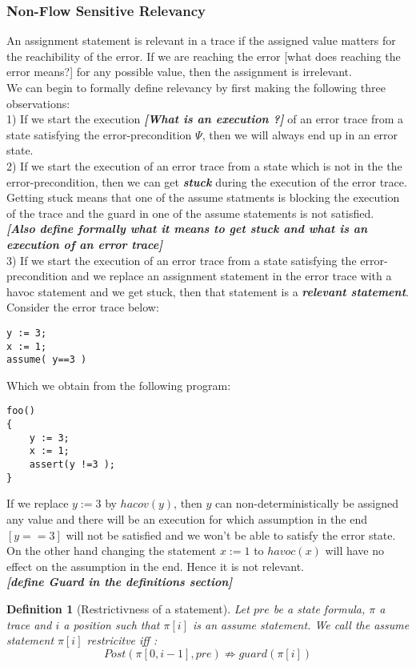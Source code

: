 \documentclass{article}
\newcommand{\limp}{\Rightarrow}
\newtheorem{mydef}{Definition}
\begin{document}
\subsubsection{Non-Flow Sensitive Relevancy}
An assignment statement is relevant in a trace if the assigned value matters for the reachibility of the error. If we are reaching the error [what does reaching the error means?] for any possible value, then the assignment is irrelevant.\\
We can begin to formally define relevancy by first making the following three observations:\\
1) If we start the execution \textbf{\textit{[What is an execution ?]}} of an error trace from a state satisfying the error-precondition $\Psi$, then we will always end up in an error state. \\
2) If we start the execution of an error trace from a state which is not in the the error-precondition, then we can get \textit{\textbf{stuck}} during the execution of the error trace. Getting stuck means that one of the assume statments is blocking the execution of the trace and the guard in one of the assume statements is not satisfied. \\
\textbf{\textit{[Also define formally what it means to get stuck and what is an execution of an error trace]}}\\
3) If we start the execution of an error trace from a state satisfying the error-precondition and we replace an assignment statement in the error trace with a havoc statement and we get stuck, then that statement is a \textit{\textbf{relevant statement}}.\\
Consider the error trace below:
\begin{lstlisting}
y := 3;
x := 1;
assume( y==3 )
\end{lstlisting}
Which we obtain from the following program:
\begin{lstlisting}
foo()
{
	y := 3;
	x := 1;
	assert(y !=3 );
}
\end{lstlisting}
If we replace $y:=3$ by $hacov(y)$, then $y$ can non-deterministically be assigned any value and there will be an execution for which assumption in the end $[y==3]$ will not be satisfied and we won't be able to satisfy the error state.\\
On the other hand changing the statement $x := 1$ to $havoc(x)$ will have no effect on the assumption in the end. Hence it is not relevant.\\
\textit{\textbf{[define Guard in the definitions section]}}
\begin{mydef}[Restrictivness of a statement]
Let $pre$ be a state formula, $\pi$ a trace and $i$ a position such that $\pi[i]$ is an assume statement. We call the assume statement $\pi[i]$ \emph{restricitve} iff :
$$Post(\pi[0,i-1], pre) \not \limp guard(\pi[i])$$
\end{mydef}
\end{document}

